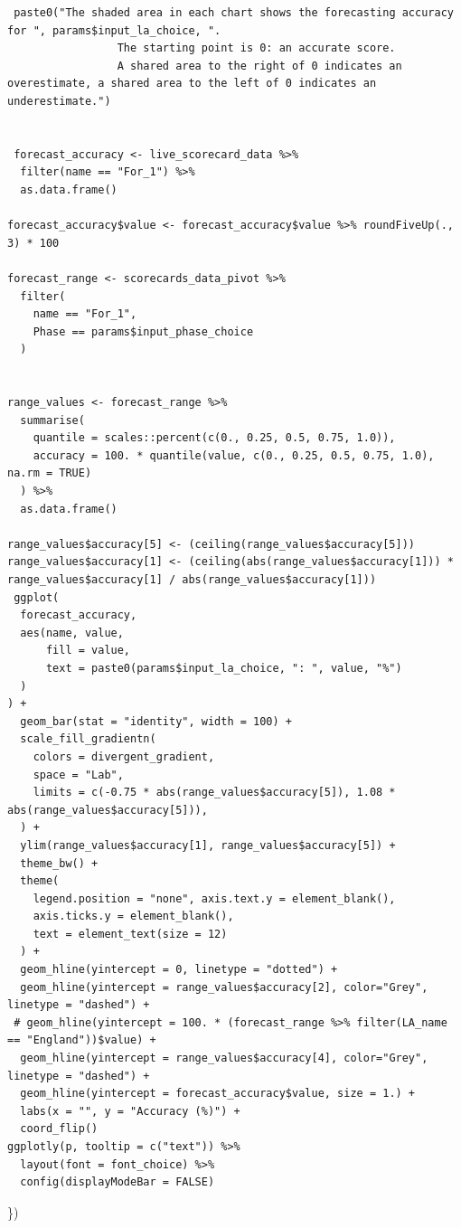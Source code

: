 \documentclass[
]{article}
\begin{document}
\begin{verbatim}
 paste0("The shaded area in each chart shows the forecasting accuracy for ", params$input_la_choice, ".
                 The starting point is 0: an accurate score.
                 A shared area to the right of 0 indicates an overestimate, a shared area to the left of 0 indicates an underestimate.")


 forecast_accuracy <- live_scorecard_data %>%
  filter(name == "For_1") %>%
  as.data.frame()

forecast_accuracy$value <- forecast_accuracy$value %>% roundFiveUp(., 3) * 100

forecast_range <- scorecards_data_pivot %>%
  filter(
    name == "For_1",
    Phase == params$input_phase_choice
  )


range_values <- forecast_range %>%
  summarise(
    quantile = scales::percent(c(0., 0.25, 0.5, 0.75, 1.0)),
    accuracy = 100. * quantile(value, c(0., 0.25, 0.5, 0.75, 1.0), na.rm = TRUE)
  ) %>%
  as.data.frame()

range_values$accuracy[5] <- (ceiling(range_values$accuracy[5]))
range_values$accuracy[1] <- (ceiling(abs(range_values$accuracy[1])) * range_values$accuracy[1] / abs(range_values$accuracy[1]))
 ggplot(
  forecast_accuracy,
  aes(name, value,
      fill = value,
      text = paste0(params$input_la_choice, ": ", value, "%")
  )
) +
  geom_bar(stat = "identity", width = 100) +
  scale_fill_gradientn(
    colors = divergent_gradient,
    space = "Lab",
    limits = c(-0.75 * abs(range_values$accuracy[5]), 1.08 * abs(range_values$accuracy[5])),
  ) +
  ylim(range_values$accuracy[1], range_values$accuracy[5]) +
  theme_bw() +
  theme(
    legend.position = "none", axis.text.y = element_blank(),
    axis.ticks.y = element_blank(),
    text = element_text(size = 12)
  ) +
  geom_hline(yintercept = 0, linetype = "dotted") +
  geom_hline(yintercept = range_values$accuracy[2], color="Grey", linetype = "dashed") +
 # geom_hline(yintercept = 100. * (forecast_range %>% filter(LA_name == "England"))$value) +
  geom_hline(yintercept = range_values$accuracy[4], color="Grey", linetype = "dashed") +
  geom_hline(yintercept = forecast_accuracy$value, size = 1.) +
  labs(x = "", y = "Accuracy (%)") +
  coord_flip()
ggplotly(p, tooltip = c("text")) %>%
  layout(font = font_choice) %>%
  config(displayModeBar = FALSE)
\end{verbatim}

\})

\newpage
\vspace*{\fill}
\color{dfeheadingblue}{\hrule}
\color{black}
\end{document}
